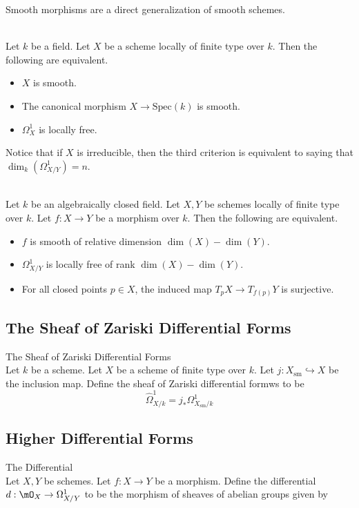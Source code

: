 \documentclass[a4paper]{article}
\begin{document}
Smooth morphisms are a direct generalization of smooth schemes. 

\begin{lmm}{}{}\\
Let $k$ be a field. Let $X$ be a scheme locally of finite type over $k$. Then the following are equivalent. 
\begin{itemize}
\item $X$ is smooth. 
\item The canonical morphism $X\to\text{Spec}(k)$ is smooth. 
\item $\Omega_X^1$ is locally free. 
\end{itemize}
\end{lmm}

Notice that if $X$ is irreducible, then the third criterion is equivalent to saying that $\dim_k(\Omega_{X/Y}^1)=n$. 

\begin{prp}{}{}\\
Let $k$ be an algebraically closed field. Let $X,Y$ be schemes locally of finite type over $k$. Let $f:X\to Y$ be a morphism over $k$. Then the following are equivalent. 
\begin{itemize}
\item $f$ is smooth of relative dimension $\dim(X)-\dim(Y)$. 
\item $\Omega_{X/Y}^1$ is locally free of rank $\dim(X)-\dim(Y)$. 
\item For all closed points $p\in X$, the induced map $T_pX\to T_{f(p)}Y$ is surjective. 
\end{itemize}
\end{prp}

\subsection{The Sheaf of Zariski Differential Forms}
\begin{defn}{The Sheaf of Zariski Differential Forms}{}\\
Let $k$ be a scheme. Let $X$ be a scheme of finite type over $k$. Let $j:X_\text{sm}\hookrightarrow X$ be the inclusion map. Define the sheaf of Zariski differential formws to be $$\widehat{\Omega}_{X/k}^1=j_\ast\Omega_{X_\text{sm}/k}^1$$
\end{defn}

\subsection{Higher Differential Forms}
\begin{defn}{The Differential}{}\\
Let $X,Y$ be schemes. Let $f:X\to Y$ be a morphism. Define the differential $d:\mO_X\to\Omega_{X/Y}^1$ to be the morphism of sheaves of abelian groups given by
\end{defn}
\end{document}
